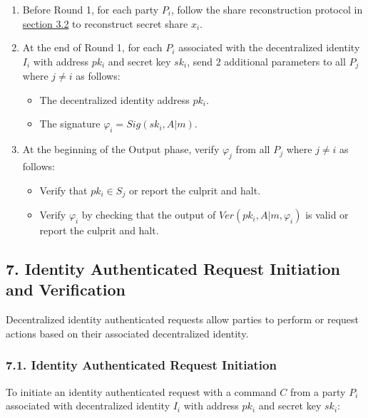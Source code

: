 \documentclass[
]{article}
\providecommand{\tightlist}{%
  \setlength{\itemsep}{0pt}\setlength{\parskip}{0pt}}
\begin{document}
\begin{enumerate}
\def\labelenumi{\arabic{enumi}.}
\tightlist
\item
  Before Round 1, for each party \(P_i\), follow the share
  reconstruction protocol in
  \protect\hyperlink{share-reconstruction}{section 3.2} to reconstruct
  secret share \(x_i\).
\item
  At the end of Round 1, for each \(P_i\) associated with the
  decentralized identity \(I_i\) with address \(pk_i\) and secret key
  \(sk_i\), send 2 additional parameters to all \(P_j\) where
  \(j \neq i\) as follows:

  \begin{itemize}
  \tightlist
  \item
    The decentralized identity address \(pk_i\).
  \item
    The signature \(\varphi _i = Sig(sk_i, A | m)\).
  \end{itemize}
\item
  At the beginning of the Output phase, verify \(\varphi _j\) from all
  \(P_j\) where \(j \neq i\) as follows:

  \begin{itemize}
  \tightlist
  \item
    Verify that \(pk_i \in S_j\) or report the culprit and halt.
  \item
    Verify \(\varphi _i\) by checking that the output of
    \(Ver(pk_i, A | m, \varphi _i)\) is valid or report the culprit and
    halt.
  \end{itemize}
\end{enumerate}

\hypertarget{identity-authed-request}{%
\subsection{7. Identity Authenticated Request Initiation and
Verification}\label{identity-authed-request}}

Decentralized identity authenticated requests allow parties to perform
or request actions based on their associated decentralized identity.

\hypertarget{identity-authed-request-initiation}{%
\subsubsection{7.1. Identity Authenticated Request
Initiation}\label{identity-authed-request-initiation}}

To initiate an identity authenticated request with a command \(C\) from
a party \(P_i\) associated with decentralized identity \(I_i\) with
address \(pk_i\) and secret key \(sk_i\):
\end{document}
